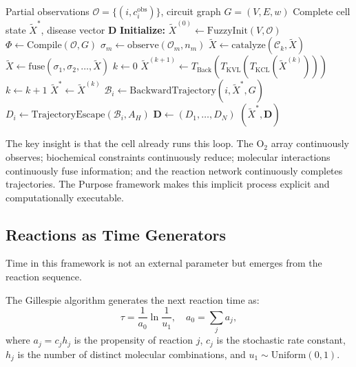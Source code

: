 \documentclass[twocolumn,10pt,a4paper]{article}
\theoremstyle{definition}
\theoremstyle{remark}
\newcommand{\Back}{\mathcal{B}}
\newcommand{\morphism}{\Phi}
\newcommand{\catalyst}{\mathcal{C}}
\begin{document}
\begin{algorithm}[t]
\caption{Cell State Instantiation Loop}
\label{alg:instantiation}
\begin{algorithmic}[1]
\Require Partial observations $\mathcal{O} = \{(i, c_i^{\mathrm{obs}})\}$, circuit graph $G = (V, E, w)$
\Ensure Complete cell state $\tilde{X}^*$, disease vector $\mathbf{D}$
\State \textbf{Initialize:} $\tilde{X}^{(0)} \gets \mathrm{FuzzyInit}(V, \mathcal{O})$ 
\State $\morphism \gets \mathrm{Compile}(\mathcal{O}, G)$ 
    \State $\sigma_m \gets \mathrm{observe}(\mathcal{O}_m, n_m)$ 
\EndFor
\For{each catalyst $\catalyst_k$ in $\morphism$}
    \State $\tilde{X} \gets \mathrm{catalyze}(\catalyst_k, \tilde{X})$ 
\EndFor
{}
    \State $\tilde{X} \gets \mathrm{fuse}(\sigma_1, \sigma_2, \ldots, \tilde{X})$ 
\EndIf
\State $k \gets 0$
\Repeat {}
    \State $\tilde{X}^{(k+1)} \gets T_{\mathrm{Back}}(T_{\mathrm{KVL}}(T_{\mathrm{KCL}}(\tilde{X}^{(k)})))$
    \State $k \gets k + 1$
\State $\tilde{X}^* \gets \tilde{X}^{(k)}$
    \State $\Back_i \gets \mathrm{BackwardTrajectory}(i, \tilde{X}^*, G)$
    \State $D_i \gets \mathrm{TrajectoryEscape}(\Back_i, A_H)$ 
\EndFor
\State $\mathbf{D} \gets (D_1, \ldots, D_N)$
\State \Return $(\tilde{X}^*, \mathbf{D})$
\end{algorithmic}
\end{algorithm}

The key insight is that the cell already runs this loop. The O$_2$ array continuously observes; biochemical constraints continuously reduce; molecular interactions continuously fuse information; and the reaction network continuously completes trajectories. The Purpose framework makes this implicit process explicit and computationally executable.

\subsection{Reactions as Time Generators}

Time in this framework is not an external parameter but emerges from the reaction sequence.

The Gillespie algorithm \citep{Gillespie1977} generates the next reaction time as:
\begin{equation}
    \tau = \frac{1}{a_0} \ln\frac{1}{u_1}, \quad a_0 = \sum_j a_j,
    \label{eq:gillespie}
\end{equation}
where $a_j = c_j h_j$ is the propensity of reaction $j$, $c_j$ is the stochastic rate constant, $h_j$ is the number of distinct molecular combinations, and $u_1 \sim \mathrm{Uniform}(0,1)$.
\end{document}
